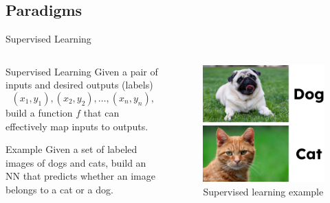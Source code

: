 \documentclass{beamer}
\begin{document}
    \subsection{Paradigms}
	\begin{frame}{Supervised Learning}
		\begin{columns}
        \begin{column}{0.5\textwidth}
	    \begin{block}{Supervised Learning}
        Given a pair of inputs and desired outputs (labels) 
         \[
         (x_1,y_1),(x_2,y_2),\dots,(x_n,y_n),
         \]
         build a function $f$ that can effectively map inputs to outputs.
	    \end{block}
        
        \begin{exampleblock}{Example}
        Given a set of labeled images of dogs and cats, build an NN that predicts whether an image belongs to a cat or a dog.
        \end{exampleblock}
        \end{column}
        \begin{column}{0.5\textwidth}
        \begin{figure}
        \centering
            \includegraphics[width=\textwidth]{images/presentation/classification.png}
            \caption{Supervised learning example}
        \end{figure}
        \end{column}
        \end{columns}
	\end{frame}
\end{document}
